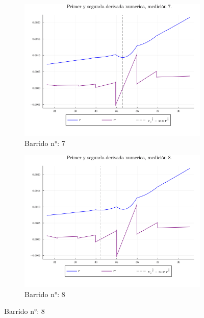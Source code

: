 \begin{figure}[H]
\ContinuedFloat %
\centering
\begin{subfigure}[b]{0.49\textwidth}
	\centering
	\includegraphics[width=\linewidth]{img/potderps7.png}
	\caption{Barrido n°: 7}
	\label{fig:potderps7}
\end{subfigure}
\hfill
\begin{subfigure}[b]{0.49\textwidth}
	\centering
	\includegraphics[width=\linewidth]{img/potderps8.png}
	\caption{Barrido n°: 8}
	\label{fig:potderps8}
\end{subfigure}
\end{figure}


